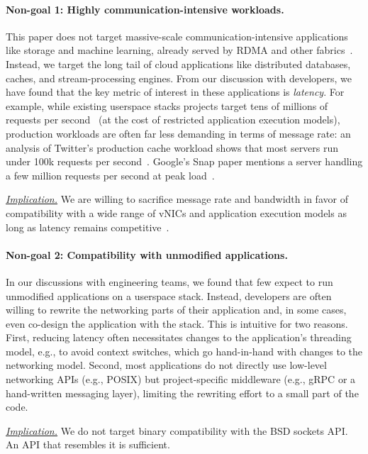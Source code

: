 \paragraph{Non-goal 1: Highly communication-intensive workloads.}
\label{sec:non_roadblocks}
This paper does not target massive-scale communication-intensive applications like storage and machine learning, already served by RDMA and other fabrics~\cite{Bai:nsdi23, azurehpc, efa}.
Instead, we target the long tail of cloud applications like distributed databases, caches, and stream-processing engines.
From our discussion with developers, we have found that the key metric of interest in these applications is \emph{latency}.
For example, while existing userspace stacks projects target tens of millions of requests per second~\cite{erpc,demi-kernel,farm,kv-driect} (at the cost of restricted application execution models), production workloads are often far less demanding in terms of message rate: an analysis of Twitter's production cache workload shows that most servers run under 100k requests per second~\cite{twitter-trace}.
Google's Snap paper mentions a server handling a few million requests per second at peak load~\cite{snap}.

\ul{\textit{Implication.}} We are willing to sacrifice message rate and bandwidth in favor of compatibility with a wide range of vNICs and application execution models as long as latency remains competitive~\cite{tail-at-scale, killer, Chardonnay2023OSDI}.

\paragraph{Non-goal 2: Compatibility with unmodified applications.}
In our discussions with engineering teams, we found that few expect to run unmodified applications on a userspace stack.
Instead, developers are often willing to rewrite the networking parts of their application and, in some cases, even co-design the application with the stack.
This is intuitive for two reasons.
First, reducing latency often necessitates changes to the application's threading model, e.g., to avoid context switches, which go hand-in-hand with changes to the networking model.
Second, most applications do not directly use low-level networking APIs (e.g., POSIX) but project-specific middleware (e.g., gRPC or a hand-written messaging layer), limiting the rewriting effort to a small part of the code.

\ul{\textit{Implication.}} We do not target binary compatibility with the BSD sockets API.
An API that resembles it is sufficient.